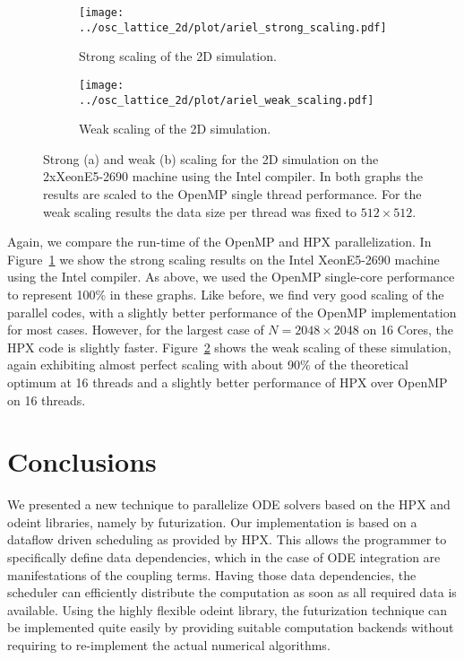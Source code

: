 \documentclass[10pt]{elsarticle}
\begin{document}
\begin{figure}
 \begin{subfigure}[b]{0.49\textwidth}
  \centering
  \texttt{[image: ../osc\_lattice\_2d/plot/ariel\_strong\_scaling.pdf]}\hfill
  \caption{Strong scaling of the 2D simulation.} 
  \label{fig:strong_scaling2D}
 \end{subfigure}
 \begin{subfigure}[b]{0.49\textwidth}
  \centering
  \texttt{[image: ../osc\_lattice\_2d/plot/ariel\_weak\_scaling.pdf]}\hfill
  \caption{Weak scaling of the 2D simulation.} 
  \label{fig:weak_scaling2D}
 \end{subfigure}
 \caption{Strong (a) and weak (b) scaling for the 2D simulation on the 2xXeonE5-2690 machine using the Intel compiler. In both graphs the results are scaled to the OpenMP single thread performance. For the weak scaling results the data size per thread was fixed to $512\times512$.}
 \label{fig:marvin_scaling2D}
\end{figure}

Again, we compare the run-time of the OpenMP and HPX parallelization.
In Figure~\ref{fig:strong_scaling2D} we show the strong scaling results on the Intel XeonE5-2690 machine using the Intel compiler.
As above, we used the OpenMP single-core performance to represent 100\% in these graphs.
Like before, we find very good scaling of the parallel codes, with a slightly better performance of the OpenMP implementation for most cases.
However, for the largest case of $N=2048\times2048$ on 16 Cores, the HPX code is slightly faster.
Figure~\ref{fig:weak_scaling2D} shows the weak scaling of these simulation, again exhibiting almost perfect scaling with about 90\% of the theoretical optimum at 16 threads and a slightly better performance of HPX over OpenMP on 16 threads.


\section{Conclusions} \label{sec:conc}

We presented a new technique to parallelize ODE solvers based on the HPX and odeint libraries, namely by futurization.
Our implementation is based on a dataflow driven scheduling as provided by HPX.
This allows the programmer to specifically define data dependencies, which in the case of ODE integration are manifestations of the coupling terms.
Having those data dependencies, the scheduler can efficiently distribute the computation as soon as all required data is available.
Using the highly flexible odeint library, the futurization technique can be implemented quite easily by providing suitable computation backends without requiring to re-implement the actual numerical algorithms.
\end{document}
